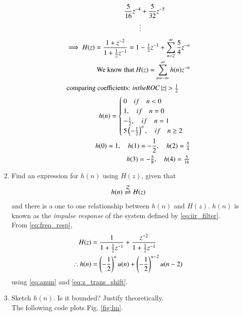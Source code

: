 \documentclass[journal,12pt,twocolumn]{IEEEtran}
\renewcommand\thesection{\arabic{section}}
\begin{document}
\begin{enumerate}[label=\thesection.\arabic*]
\begin{align*}
				&\text{\quad}\text{\quad}\text{\quad}\text{ }\text{ }\text{ }\text{ }\text{ }\text{ }\text{ }\frac{5}{16}z^{-4} + \frac{5}{32}z^{-5}\\
				&\text{\quad}\text{\quad}\text{\quad}\text{\quad}\text{\quad}\text{\quad}\text{\quad} \normalsize \vdots
			\end{align*}
			\normalsize
			\begin{align}
				\implies H(z) = \frac{1 + z^{-2}}{1+\tfrac{1}{2}z^{-1}} = 1 - \tfrac{1}{2}z^{-1} + \sum_{n=2}^{\infty}\frac{5}{4}z^{-n}\\
				\text{We know that } H(z) =\sum ^{\infty }_{n=-\infty }h(n) z^{-n}\\
				\intertext{comparing coefficients: \( in the ROC \left\vert z\right\vert > \frac{1}{2}\)}
				h(n) = \begin{cases}
					0 \quad if \quad n < 0\\
					1, \quad if \quad n = 0\\
					-\frac{1}{2}, \quad if \quad n = 1\\
					5\left(-\tfrac{1}{2}\right)^{n}, \quad if \quad n \ge 2
				\end{cases}\\
				h(0) = 1,\quad h(1) = -\frac{1}{2},\quad h(2) = \tfrac{5}{4}\\
				h(3) = -\tfrac{5}{8},\quad h(4) = \tfrac{5}{16}
			\end{align}
			\item \label{prob:impulse_resp}
			Find an expression for $h(n)$ using $H(z)$, given that 
			\begin{equation}
				\label{eq:impulse_resp}
				h(n) \overset{\mathcal{Z}}{ \rightleftharpoons} H(z)
			\end{equation}
			and there is a one to one relationship between $h(n)$ and $H(z)$. $h(n)$ is known as the {\em impulse response} of the
			system defined by \eqref{eq:iir_filter}.
			\\
			\solution From \eqref{eq:freq_resp},
			\begin{align}
				H(z) &= \frac{1}{1 + \frac{1}{2}z^{-1}} + \frac{ z^{-2}}{1 + \frac{1}{2}z^{-1}}
				\\
				\therefore h(n) &= \left(-\frac{1}{2}\right)^{n}u(n) + \left(-\frac{1}{2}\right)^{n-2}u(n-2)
			\end{align}
			using \eqref{eq:anun} and \eqref{eq:z_trans_shift}.
			\item Sketch $h(n)$. Is it bounded? Justify theoretically.
			\\
			\solution The following code plots Fig. \ref{fig:hn}.

\end{enumerate}
\end{document}
